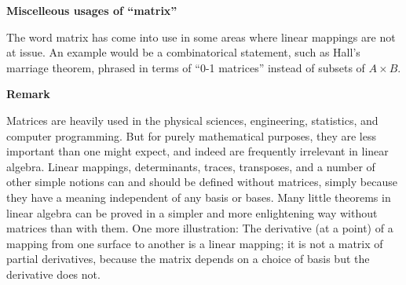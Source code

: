 \documentclass{article}
\begin{document}
\textbf{Miscelleous usages of ``matrix''}

The word matrix has come into use in some areas where linear mappings
are not at issue. An example would be a combinatorical statement,
such as Hall's marriage theorem, phrased in terms of ``0-1 matrices''
instead of subsets of $A\times B$.

\textbf{Remark}

Matrices are heavily used in the physical sciences, engineering,
statistics, and computer programming. But for purely mathematical purposes,
they are less important than one might expect, and indeed are frequently
irrelevant in linear algebra. Linear mappings, determinants, traces,
transposes, and a number of other simple notions can and should be
defined without matrices, simply because they have a meaning independent
of any basis or bases.
Many little theorems in linear algebra can be proved in a simpler
and more enlightening way without matrices than with them.
One more illustration: The derivative (at a point)
of a mapping from one surface to another is a linear mapping; it is not a
matrix of partial derivatives, because the matrix depends on a choice
of basis but the derivative does not.
\end{document}
